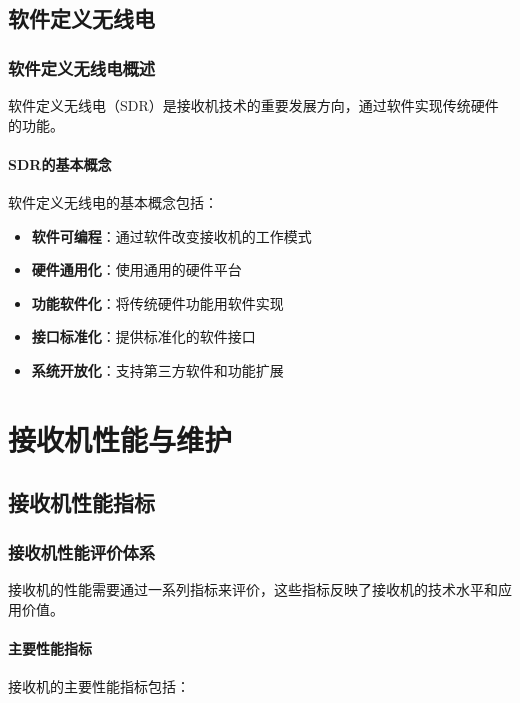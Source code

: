 \documentclass[12pt,UTF8]{ctexbook}
\begin{document}
\chapter{软件定义无线电}

\section{软件定义无线电概述}

软件定义无线电（SDR）是接收机技术的重要发展方向，通过软件实现传统硬件的功能。

\subsection{SDR的基本概念}

软件定义无线电的基本概念包括：

\begin{itemize}[leftmargin=3.5em]
    \item \textbf{软件可编程}：通过软件改变接收机的工作模式
    \item \textbf{硬件通用化}：使用通用的硬件平台
    \item \textbf{功能软件化}：将传统硬件功能用软件实现
    \item \textbf{接口标准化}：提供标准化的软件接口
    \item \textbf{系统开放化}：支持第三方软件和功能扩展
\end{itemize}

\part{接收机性能与维护}

\chapter{接收机性能指标}

\section{接收机性能评价体系}

接收机的性能需要通过一系列指标来评价，这些指标反映了接收机的技术水平和应用价值。

\subsection{主要性能指标}

接收机的主要性能指标包括：
\end{document}
